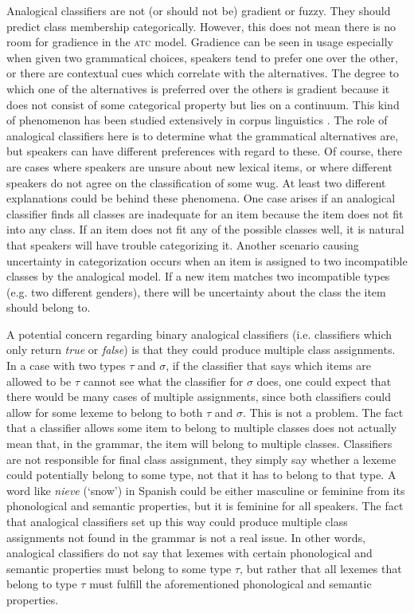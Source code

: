 Analogical classifiers are not (or should not be) gradient or fuzzy. They should predict class membership categorically. However, this does not mean there is no room for gradience in the \textsc{atc} model. Gradience can be seen in usage especially when given two grammatical choices, speakers tend to prefer one over the other, or there are contextual cues which correlate with the alternatives. The degree to which one of the alternatives is preferred over the others is gradient because it does not consist of some categorical property but lies on a continuum. This kind of phenomenon has been studied extensively in corpus linguistics \autocites{Bresnan.2007, Bresnan.2008, Francis.2014, Hay.2006, Kapatsinski.2012}. The role of analogical classifiers here is to determine what the grammatical alternatives are, but speakers can have different preferences with regard to these. Of course, there are cases where speakers are unsure about new lexical items, or where different speakers do not agree on the classification of some wug. At least two different explanations could be behind these phenomena. One case arises if an analogical classifier finds all classes are inadequate for an item because the item does not fit into any class. If an item does not fit any of the possible classes well, it is natural that speakers will have trouble categorizing it. Another scenario causing uncertainty in categorization occurs when an item is assigned to two incompatible classes by the analogical model. If a new item matches two incompatible types (e.g. two different genders), there will be uncertainty about the class the item should belong to.

A potential concern regarding binary analogical classifiers (i.e. classifiers which only return \textit{true} or \textit{false}) is that they could produce multiple class assignments. In a case with two types $\tau$ and $\sigma$, if the classifier that says which items are allowed to be $\tau$ cannot see what the classifier for $\sigma$ does, one could expect that there would be many cases of multiple assignments, since both classifiers could allow for some lexeme to belong to both $\tau$ and $\sigma$. This is not a problem. The fact that a classifier allows some item to belong to multiple classes does not actually mean that, in the grammar, the item will belong to multiple classes. Classifiers are not responsible for final class assignment, they simply say whether a lexeme could potentially belong to some type, not that it has to belong to that type. A word like \textit{nieve} (`snow') in Spanish could be either masculine or feminine from its phonological and semantic properties, but it is feminine for all speakers. The fact that analogical classifiers set up this way could produce multiple class assignments not found in the grammar is not a real issue. In other words, analogical classifiers do not say that lexemes with certain phonological and semantic properties must belong to some type $\tau$, but rather that all lexemes that belong to type $\tau$ must fulfill the aforementioned phonological and semantic properties.

